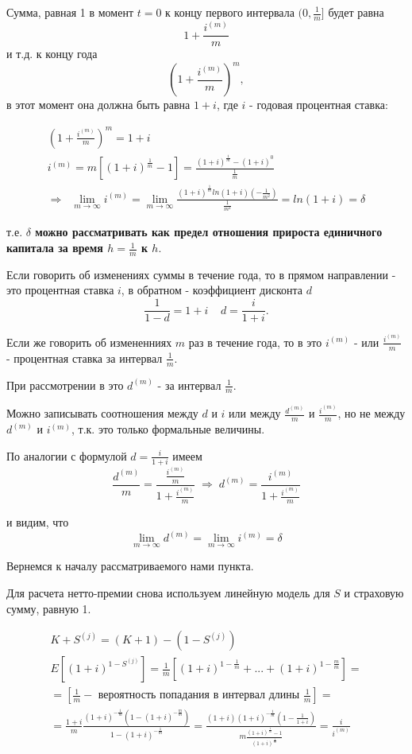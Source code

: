\begin{itemize}
	Сумма, равная 1 в момент $t = 0$ к концу первого интервала $(0,\frac{1}{m}]$ будет равна 
	\[ 1 + \frac{i^{(m)}}{m} \]
	и т.д. к концу года
	\[ (1 + \frac{i^{(m)}}{m})^m, \]
	в этот момент она должна быть равна $1+i$, где $i$ - годовая процентная ставка:

	\begin{gather*}
		(1 + \frac{i^{(m)}}{m})^m = 1+i\\
		i^{(m)} = m[(1+i)^{\frac{1}{m}} - 1] = \frac{(1+i)^{\frac{1}{m}}- (1+i)^0}{\frac{1}{m}}\\
		\Rightarrow\;\; \lim\limits_{m\rightarrow\infty}i^{(m)}=\lim\limits_{m\rightarrow\infty}\frac{(1+i)^{\frac{1}{m}}ln(1+i)(-\frac{1}{m^2})}{\frac{1}{m^2}} = ln(1+i) = \delta
		\end{gather*}
	

	т.е. \textbf{$\delta$ можно рассматривать как предел отношения прироста единичного капитала за время $h=\frac{1}{m}$ к $h$}.

	Если говорить об изменениях суммы в течение года, то в прямом направлении - это процентная ставка $i$, в обратном - коэффициент дисконта $d$
	\[\frac{1}{1-d} = 1+i \;\;\;\; d = \frac{i}{1+i}.\]

	Если же говорить об измененниях $m$ раз в течение года, то в  это $i^{(m)}$ -  или $\frac{i^{(m)}}{m}$ - процентная ставка за интервал $\frac{1}{m}$.

	При рассмотрении в  это $d^{(m)}$ -  за интервал $\frac{1}{m}$.

	Можно записывать соотношения между $d$ и $i$ или между $\frac{d^{(m)}}{m}$ и $\frac{i^{(m)}}{m}$, но не между $d^{(m)}$ и $i^{(m)}$, т.к. это только формальные величины.

	По аналогии с формулой $d = \frac{i}{1+i}$ имеем 
	\[  \frac{d^{(m)}}{m} = \frac{\frac{i^{(m)}}{m}}{1+\frac{i^{(m)}}{m}}\;\Rightarrow\;d^{(m)} = \frac{i^{(m)}}{1+\frac{i^{(m)}}{m}}\]

	и видим, что 
	\[ \lim\limits_{m\rightarrow\infty}d^{(m)} = \lim\limits_{m\rightarrow\infty}i^{(m)} = \delta \]

	Вернемся к началу рассматриваемого нами пункта.

	Для расчета нетто-премии снова используем линейную модель для $ S$ и страховую сумму, равную 1.

	\begin{gather*}
		K + S^{(j)} = (K+1) -(1 - S^{(j)})\\
		E[(1+i)^{1-S^{(j)}}] = \frac{1}{m}[(1+i)^{1-\frac{1}{m}}+...+(1+i)^{1- \frac{m}{m}	}]=\\
		=[\frac{1}{m} - \text{ вероятность попадания в интервал длины } \frac{1}{m}]=\\
		=\frac{1+i}{m}\frac{(1+i)^{-\frac{1}{m}}(1-(1+i)^{-\frac{m}{m}})}{1-(1+i)^{-\frac{1}{m}}} = \frac{(1+i)(1+i)^{-\frac{1}{m}}(1- \frac{1}{1+i})}{m \frac{(1+i)^{\frac{1}{m}}-1}{(1+i)^{\frac{1}{m}}}} = \frac{i}{i^{(m)}}
	\end{gather*}


\end{itemize}
